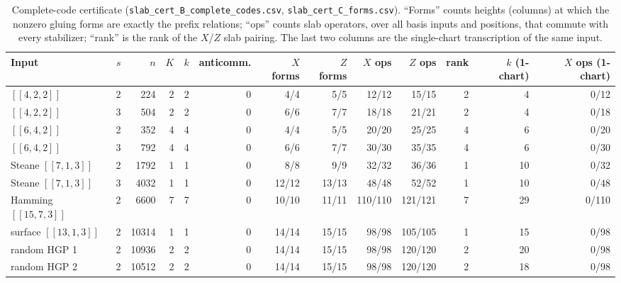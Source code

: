 \documentclass[aps,prx,reprint,superscriptaddress,nofootinbib,floatfix,longbibliography]{revtex4-2}
\theoremstyle{definition}
\begin{document}
\begin{table}[t]
\caption{Complete-code certificate (\texttt{slab\_cert\_B\_complete\_codes.csv},
\texttt{slab\_cert\_C\_forms.csv}).  ``Forms'' counts heights (columns) at
which the nonzero gluing forms are exactly the prefix relations; ``ops''
counts slab operators, over all basis inputs and positions, that commute with
every stabilizer; ``rank'' is the rank of the $X$/$Z$ slab pairing.  The last
two columns are the single-chart transcription of the same input.}
\label{tab:slab-certificate}
\centering
\scriptsize
\setlength{\tabcolsep}{3.5pt}
\begin{tabular}{@{}lrrrrrrrrrr|rr@{}}
\toprule
Input & $s$ & $n$ & $K$ & $k$ & anticomm. & $X$ forms & $Z$ forms & $X$ ops & $Z$ ops & rank & $k$ (1-chart) & $X$ ops (1-chart) \\
\midrule
$[[4,2,2]]$ & 2 & 224 & 2 & 2 & 0 & 4/4 & 5/5 & 12/12 & 15/15 & 2 & 4 & 0/12 \\
$[[4,2,2]]$ & 3 & 504 & 2 & 2 & 0 & 6/6 & 7/7 & 18/18 & 21/21 & 2 & 4 & 0/18 \\
$[[6,4,2]]$ & 2 & 352 & 4 & 4 & 0 & 4/4 & 5/5 & 20/20 & 25/25 & 4 & 6 & 0/20 \\
$[[6,4,2]]$ & 3 & 792 & 4 & 4 & 0 & 6/6 & 7/7 & 30/30 & 35/35 & 4 & 6 & 0/30 \\
Steane $[[7,1,3]]$ & 2 & 1792 & 1 & 1 & 0 & 8/8 & 9/9 & 32/32 & 36/36 & 1 & 10 & 0/32 \\
Steane $[[7,1,3]]$ & 3 & 4032 & 1 & 1 & 0 & 12/12 & 13/13 & 48/48 & 52/52 & 1 & 10 & 0/48 \\
Hamming $[[15,7,3]]$ & 2 & 6600 & 7 & 7 & 0 & 10/10 & 11/11 & 110/110 & 121/121 & 7 & 29 & 0/110 \\
surface $[[13,1,3]]$ & 2 & 10314 & 1 & 1 & 0 & 14/14 & 15/15 & 98/98 & 105/105 & 1 & 15 & 0/98 \\
random HGP 1 & 2 & 10936 & 2 & 2 & 0 & 14/14 & 15/15 & 98/98 & 120/120 & 2 & 20 & 0/98 \\
random HGP 2 & 2 & 10512 & 2 & 2 & 0 & 14/14 & 15/15 & 98/98 & 120/120 & 2 & 18 & 0/98 \\
\bottomrule
\end{tabular}
\end{table}
\end{document}
